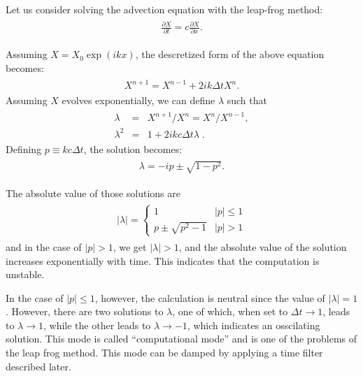 Let us consider solving the advection equation with the leap-frog method: \begin{eqnarray}\begin{aligned}
  \frac{\partial{X}}{\partial {t}} = c \frac{\partial{X}}{\partial {x}}.\end{aligned}\end{eqnarray}

Assuming \(X = X_0 \exp(ikx)\), the descretized form of the above equation becomes: \begin{eqnarray}\begin{aligned}
  X^{n+1} = X^{n-1} + 2 i k \Delta t X^n.\end{aligned}\end{eqnarray} Assuming \(X\) evolves exponentially, we can define \(\lambda\) such that \begin{eqnarray}\begin{aligned}
  \lambda &=& X^{n+1}/X^n = X^n/X^{n-1}, \\
  \lambda^2 &=& 1 + 2 i kc \Delta t \lambda \; .\end{aligned}\end{eqnarray} Defining \(p \equiv kc \Delta t\), the solution becomes: \begin{eqnarray}\begin{aligned}
 \lambda = -i p \pm \sqrt{1-p^2}.\end{aligned}\end{eqnarray}

The absolute value of those solutions are \begin{eqnarray}\begin{aligned}
  |\lambda| = \left\{
             \begin{array}{ll}
               1 & |p| \le 1 \\
               p \pm \sqrt{p^2-1} & |p| > 1
             \end{array}
             \right.\end{aligned}\end{eqnarray} and in the case of \(|p|>1\), we get \(|\lambda| > 1\), and the absolute value of the solution increases exponentially with time. This indicates that the
computation is unstable.

In the case of \(|p| \le 1\), however, the calculation is neutral since the value of \(|\lambda| = 1\). However, there are two solutions to \(\lambda\), one of which, when set to
\(\Delta t \rightarrow 1\), leads to \(\lambda \rightarrow 1\), while the other leads to \(\lambda \rightarrow -1\), which indicates an osscilating solution. This mode is called ``computational mode''
and is one of the problems of the leap frog method. This mode can be damped by applying a time filter described later.

